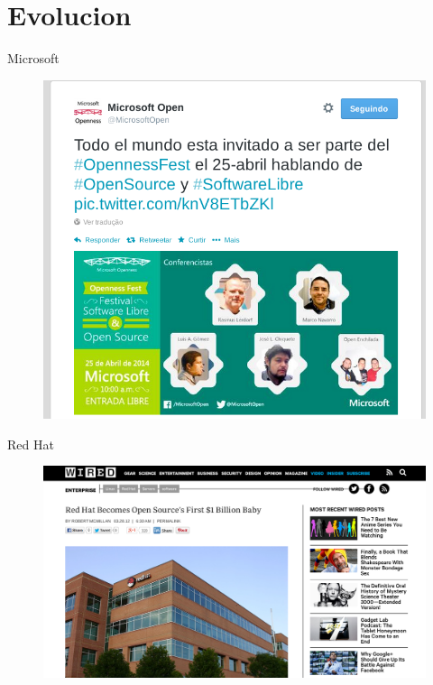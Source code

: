 \documentclass{beamer}
\begin{document}
\section{Evolucion}
\begin{frame}{Microsoft}
    \pause
    \begin{figure}[tbph]
        \centering
        \includegraphics[width=0.8\linewidth]{Images/mof.png}
    \end{figure}
\end{frame}

\begin{frame}{Red Hat}
    \pause
    \begin{figure}[tbph]
        \centering
        \includegraphics[width=0.8\linewidth]{Images/redhat.png}
    \end{figure}
\end{frame}
\end{document}
